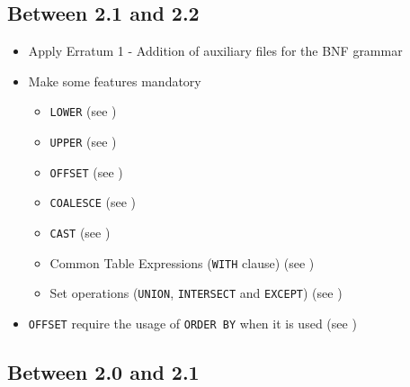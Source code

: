 \documentclass[11pt,a4paper]{ivoa}
\begin{document}
\subsection{Between 2.1 and 2.2}
\label{sec:changes-2.2}

\begin{itemize}
    \item Apply Erratum 1 - Addition of auxiliary files for the BNF grammar
    \item Make some features mandatory
        \begin{itemize}
            \item \texttt{LOWER} (see )
            \item \texttt{UPPER} (see )
            \item \texttt{OFFSET} (see )
            \item \texttt{COALESCE} (see )
            \item \texttt{CAST} (see )
            \item Common Table Expressions (\texttt{WITH} clause)
                  (see )
            \item Set operations (\texttt{UNION}, \texttt{INTERSECT} and
                  \texttt{EXCEPT}) (see )
        \end{itemize}
    \item \texttt{OFFSET} require the usage of \texttt{ORDER BY} when it is used
          (see )
\end{itemize}

\subsection{Between 2.0 and 2.1}
\label{sec:changes-2.1}
\end{document}
